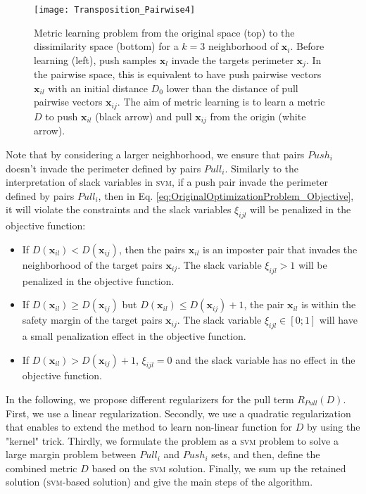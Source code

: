 \begin{figure}[h!]
	\centering
	\texttt{[image: Transposition\_Pairwise4]}
	\caption{Metric learning problem from the original space (top) to the dissimilarity space (bottom) for a $k=3$ neighborhood of $\textbf{x}_i$. Before learning (left), push samples $\textbf{x}_l$ invade the targets perimeter $\textbf{x}_j$. In the pairwise space, this is equivalent to have push pairwise vectors $\textbf{x}_{il}$ with an initial distance $D_0$ lower than the distance of pull pairwise vectors $\textbf{x}_{ij}$. The aim of metric learning is to learn a metric $D$ to push $\textbf{x}_{il}$ (black arrow) and pull $\textbf{x}_{ij}$ from the origin (white arrow).}
	\label{fig:Transposition_Pairwise}
\end{figure}
\noindent Note that by considering a larger neighborhood, we ensure that pairs $Push_i$ doesn't invade the perimeter defined by pairs $Pull_i$. Similarly to the interpretation of slack variables in \textsc{svm}, if a push pair invade the perimeter defined by pairs $Pull_i$, then in Eq. \ref{eq:OriginalOptimizationProblem_Objective}, it will violate the constraints and the slack variables $\xi_{ijl}$ will be penalized in the objective function:
\begin{itemize}
	\item If $D(\textbf{x}_{il}) < D(\textbf{x}_{ij})$, then the pairs $\textbf{x}_{il}$ is an imposter pair that invades the neighborhood of the target pairs $\textbf{x}_{ij}$. The slack variable  $\xi_{ijl} > 1$ will be penalized in the objective function. 
	\item If $D(\textbf{x}_{il}) \geq D(\textbf{x}_{ij})$ but $D(\textbf{x}_{il}) \leq D(\textbf{x}_{ij})+1$, the pair $\textbf{x}_{il}$ is within the safety margin of the target pairs $\textbf{x}_{ij}$. The slack variable $ \xi_{ijl} \in [0;1]$ will have a small penalization effect in the objective function.
	\item If $D(\textbf{x}_{il}) > D(\textbf{x}_{ij}) +1$, $\xi_{ijl} = 0$ and the slack variable has no effect in the objective function.
\end{itemize}




In the following, we propose different regularizers for the pull term $R_{Pull}(D)$. First, we use a linear regularization. Secondly, we use a quadratic regularization that enables to extend the method to learn non-linear function for $D$ by using the "kernel" trick. Thirdly, we formulate the problem as a \textsc{svm} problem to solve a large margin problem between $Pull_i$ and $Push_i$ sets, and then, define the combined metric $D$ based on the \textsc{svm} solution. Finally, we sum up the retained solution (\textsc{svm}-based solution) and give the main steps of the algorithm.


